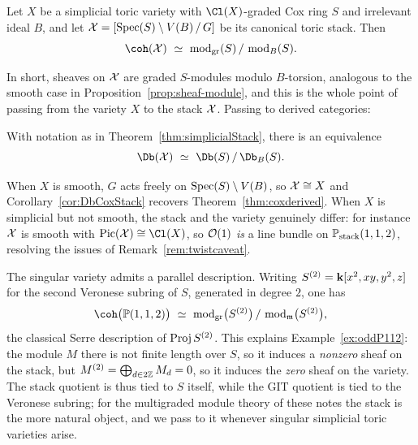 \documentclass{amsart}
\begin{document}
\begin{thm}\label{thm:simplicialStack}
  Let $X$ be a simplicial toric variety with $\Cl(X)$-graded Cox ring $S$ and irrelevant ideal $B$, and let $\mathcal X = [\operatorname{Spec}(S)\setminus V(B)\,/\,G]$ be its canonical toric stack. Then
  \[ \coh(\sX)\ \simeq\ \operatorname{mod}_{\mathrm{gr}}(S)\,/\,\operatorname{mod}_B(S). \]
\end{thm}

In short, sheaves on $\mathcal X$ are graded $S$-modules modulo $B$-torsion, analogous to the smooth case in Proposition~\ref{prop:sheaf-module}, and this is the whole point of passing from the variety $X$ to the stack $\mathcal X$. Passing to derived categories:

\begin{cor}\label{cor:DbCoxStack}
  With notation as in Theorem~\ref{thm:simplicialStack}, there is an equivalence
  \[ \Db(\sX)\ \simeq\ \Db(S)\,/\,\Db_B(S). \]
\end{cor}

When $X$ is smooth, $G$ acts freely on $\operatorname{Spec}(S)\setminus V(B)$, so $\mathcal X\cong X$ and Corollary~\ref{cor:DbCoxStack} recovers Theorem~\ref{thm:coxderived}. When $X$ is simplicial but not smooth, the stack and the variety genuinely differ: for instance $\mathcal X$ is smooth with $\Pic(\sX)\cong\Cl(X)$, so ${\mathcal O}(1)$ \emph{is} a line bundle on $\mathbb P_{\mathrm{stack}}(1,1,2)$, resolving the issues of Remark~\ref{rem:twistcaveat}.

\begin{remark}\label{rem:veronese}
  The singular variety admits a parallel description. Writing $S^{(2)}={\bf k}[x^2,xy,y^2,z]$ for the second Veronese subring of $S$, generated in degree $2$, one has
  \[ \coh\bigl(\PP(1,1,2)\bigr)\ \simeq\ \operatorname{mod}_{\mathrm{gr}}\bigl(S^{(2)}\bigr)\,/\,\operatorname{mod}_{\m}\bigl(S^{(2)}\bigr), \]
  the classical Serre description of $\operatorname{Proj} S^{(2)}$. This explains Example~\ref{ex:oddP112}: the module $M$ there is not finite length over $S$, so it induces a \emph{nonzero} sheaf on the stack, but $M^{(2)}=\bigoplus_{d\in2\mathbb Z}M_d=0$, so it induces the \emph{zero} sheaf on the variety. The stack quotient is thus tied to $S$ itself, while the GIT quotient is tied to the Veronese subring; for the multigraded module theory of these notes the stack is the more natural object, and we pass to it whenever singular simplicial toric varieties arise. %
\end{remark}


\ifdefined\whole
\else


\end{document}
